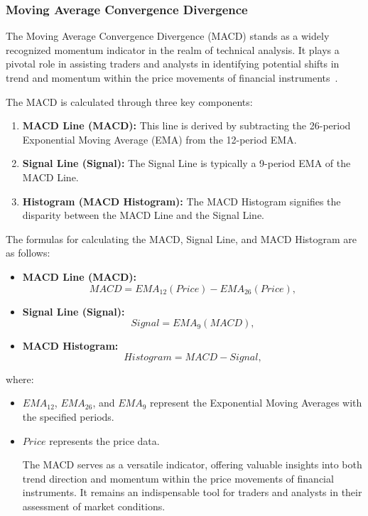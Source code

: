 \documentclass[10pt,twocolumn,letterpaper]{article}
\begin{document}
\subsubsection{Moving Average Convergence Divergence}

The Moving Average Convergence Divergence (MACD) stands as a widely recognized momentum indicator in the realm of technical analysis. It plays a pivotal role in assisting traders and analysts in identifying potential shifts in trend and momentum within the price movements of financial instruments~\cite{TongChio}.

The MACD is calculated through three key components:
\begin{enumerate}
   \item \textbf{MACD Line (MACD):} This line is derived by subtracting the 26-period Exponential Moving Average (EMA) from the 12-period EMA.
   \item \textbf{Signal Line (Signal):} The Signal Line is typically a 9-period EMA of the MACD Line.
   \item \textbf{Histogram (MACD Histogram):} The MACD Histogram signifies the disparity between the MACD Line and the Signal Line.
\end{enumerate}
The formulas for calculating the MACD, Signal Line, and MACD Histogram are as follows:
\begin{itemize}
   \item \textbf{MACD Line (MACD):}
         \[ MACD = EMA_{12}(Price) - EMA_{26}(Price), \]

   \item \textbf{Signal Line (Signal):}
         \[ Signal = EMA_{9}(MACD), \]

   \item \textbf{MACD Histogram:}
         \[ Histogram = MACD - Signal, \]
\end{itemize}
where:
\begin{itemize}
   \item \(EMA_{12}\), \(EMA_{26}\), and \(EMA_{9}\) represent the Exponential Moving Averages with the specified periods.
   \item \(Price\) represents the price data.

         The MACD serves as a versatile indicator, offering valuable insights into both trend direction and momentum within the price movements of financial instruments. It remains an indispensable tool for traders and analysts in their assessment of market conditions.
\end{itemize}
\end{document}
